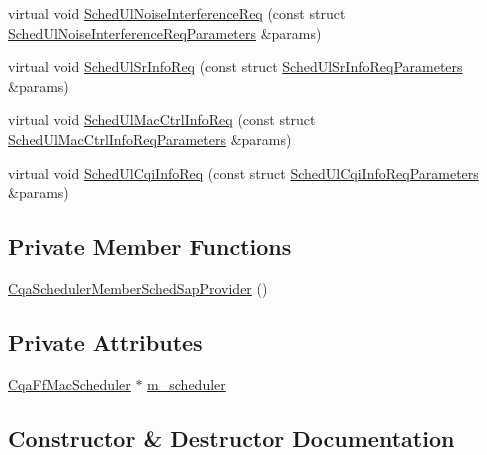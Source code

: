 \begin{DoxyCompactItemize}
\item 
virtual void \hyperlink{classns3_1_1CqaSchedulerMemberSchedSapProvider_ac0ab486764ca6425c12e3f8231af5d6b}{Sched\+Ul\+Noise\+Interference\+Req} (const struct \hyperlink{structns3_1_1FfMacSchedSapProvider_1_1SchedUlNoiseInterferenceReqParameters}{Sched\+Ul\+Noise\+Interference\+Req\+Parameters} \&params)
\item 
virtual void \hyperlink{classns3_1_1CqaSchedulerMemberSchedSapProvider_a2d265d622849aa5b64ddc4ad1d85436d}{Sched\+Ul\+Sr\+Info\+Req} (const struct \hyperlink{structns3_1_1FfMacSchedSapProvider_1_1SchedUlSrInfoReqParameters}{Sched\+Ul\+Sr\+Info\+Req\+Parameters} \&params)
\item 
virtual void \hyperlink{classns3_1_1CqaSchedulerMemberSchedSapProvider_a0a58c5b3e47e93bbf50afd04a3bccb6c}{Sched\+Ul\+Mac\+Ctrl\+Info\+Req} (const struct \hyperlink{structns3_1_1FfMacSchedSapProvider_1_1SchedUlMacCtrlInfoReqParameters}{Sched\+Ul\+Mac\+Ctrl\+Info\+Req\+Parameters} \&params)
\item 
virtual void \hyperlink{classns3_1_1CqaSchedulerMemberSchedSapProvider_acb26eb7783c35cb01a74356b2c09b3df}{Sched\+Ul\+Cqi\+Info\+Req} (const struct \hyperlink{structns3_1_1FfMacSchedSapProvider_1_1SchedUlCqiInfoReqParameters}{Sched\+Ul\+Cqi\+Info\+Req\+Parameters} \&params)
\end{DoxyCompactItemize}
\subsection*{Private Member Functions}
\begin{DoxyCompactItemize}
\item 
\hyperlink{classns3_1_1CqaSchedulerMemberSchedSapProvider_a12c244b9d45b0fc8e5c0e00acd0fba90}{Cqa\+Scheduler\+Member\+Sched\+Sap\+Provider} ()
\end{DoxyCompactItemize}
\subsection*{Private Attributes}
\begin{DoxyCompactItemize}
\item 
\hyperlink{classns3_1_1CqaFfMacScheduler}{Cqa\+Ff\+Mac\+Scheduler} $\ast$ \hyperlink{classns3_1_1CqaSchedulerMemberSchedSapProvider_ab296b58e9d62b7dc2224e0dc2f0f3835}{m\+\_\+scheduler}
\end{DoxyCompactItemize}


\subsection{Constructor \& Destructor Documentation}
